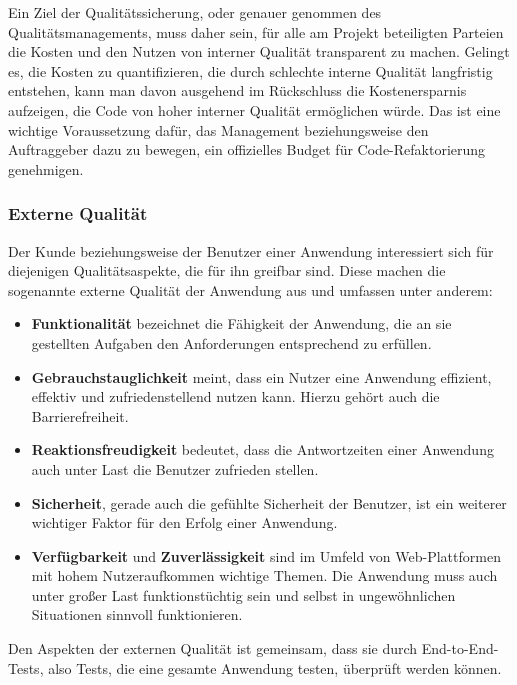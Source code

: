 Ein Ziel der Qualitätssicherung, oder genauer genommen des Qualitätsmanagements, muss daher sein, für alle am Projekt beteiligten Parteien die Kosten und den Nutzen von
interner Qualität transparent zu machen. Gelingt es, die Kosten zu quantifizieren, die durch schlechte interne Qualität langfristig entstehen, kann man davon ausgehend im
Rückschluss die Kostenersparnis aufzeigen, die Code von hoher interner Qualität ermöglichen würde. Das ist eine wichtige Voraussetzung dafür, das Management beziehungsweise
den Auftraggeber dazu zu bewegen, ein offizielles Budget für Code-Refaktorierung genehmigen.


\subsubsection{Externe Qualität}
Der Kunde beziehungsweise der Benutzer einer Anwendung interessiert sich für diejenigen Qualitätsaspekte, die für ihn greifbar sind. Diese machen die sogenannte externe Qualität
der Anwendung aus und umfassen unter anderem: %
\begin{itemize}
	\item \textbf{Funktionalität} bezeichnet die Fähigkeit der Anwendung, die an sie gestellten Aufgaben den Anforderungen entsprechend zu erfüllen.
	
	\item \textbf{Gebrauchstauglichkeit} meint, dass ein Nutzer eine Anwendung effizient, effektiv und zufriedenstellend nutzen kann. Hierzu gehört auch die Barrierefreiheit.

	\item \textbf{Reaktionsfreudigkeit} bedeutet, dass die Antwortzeiten einer Anwendung auch unter Last die Benutzer zufrieden stellen. 

	\item \textbf{Sicherheit}, gerade auch die gefühlte Sicherheit der Benutzer, ist ein weiterer wichtiger Faktor für den Erfolg einer Anwendung.

	\item \textbf{Verfügbarkeit} und \textbf{Zuverlässigkeit} sind im Umfeld von Web-Plattformen mit hohem Nutzeraufkommen wichtige Themen. Die Anwendung muss auch unter großer Last funktionstüchtig sein und selbst in ungewöhnlichen Situationen sinnvoll funktionieren.
\end{itemize}

Den Aspekten der externen Qualität ist gemeinsam, dass sie durch End-to-End-Tests, also Tests, die eine gesamte Anwendung testen, überprüft werden können.

